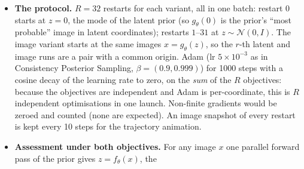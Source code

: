 \documentclass[11pt]{article}
\begin{document}
\begin{itemize}
        (the posterior of $z$ given $y$ has density $\propto \mathcal{N}(z)\,
        p(y|g_\theta(z))$, the Jacobian cancelling exactly because
        $p_\theta(g_\theta(z))\,|\det \partial g_\theta/\partial z| =
        \mathcal{N}(z)$); $J_x$ is the negative log posterior density in
        pixel coordinates. Since $\log p_\theta(x) = \log\mathcal{N}(f_\theta(x)) +
        \log|\det \partial f_\theta/\partial x|$,
        \[
          J_x(g_\theta(z)) = J_z(z) - \log\left|\det \frac{\partial f_\theta}{\partial x}\right|_{g_\theta(z)},
        \]
        so the two minimisers coincide only where the flow's log-Jacobian
        is flat. A MAP estimate is not invariant under reparametrisation; a
        density is. Both constants ($\tfrac{n}{2}\log 2\pi$ and
        $\tfrac{n_{\rm obs}}{2}\log 2\pi\sigma^2$) are kept, so $J_z$ and
        $J_x$ are on the same nats scale and every image can be scored under
        both. The latent MAP is what a one-step generator without a density
        (a GAN, a consistency model) allows; the image MAP needs
        $\log p_\theta$ and exists here because the prior is a flow. Their
        costs are opposite: one step of $J_z$ is the differentiable
        sequential inverse of step 10 ($8 \times 63$ cached token steps,
        forward and backward), one step of $J_x$ is one parallel forward
        pass through the prior with per-block activation checkpointing.
  \item \textbf{The protocol.} $R = 32$ restarts for each variant, all in
        one batch: restart 0 starts at $z = 0$, the mode of the latent prior
        (so $g_\theta(0)$ is the prior's ``most probable'' image in latent
        coordinates); restarts $1$--$31$ at $z \sim \mathcal{N}(0, I)$. The
        image variant starts at the same images $x = g_\theta(z)$, so the
        $r$-th latent and image runs are a pair with a common origin. Adam
        (lr $5 \times 10^{-3}$ as in Consistency Posterior Sampling,
        $\beta = (0.9, 0.999)$) for 1000 steps with a cosine decay of the
        learning rate to zero, on the \emph{sum} of the $R$ objectives:
        because the objectives are independent and Adam is per-coordinate,
        this is $R$ independent optimisations in one launch. Non-finite
        gradients would be zeroed and counted (none are expected). An
        image snapshot of every restart is kept every 10 steps for the
        trajectory animation.
  \item \textbf{Assessment under both objectives.} For any image $x$ one
        parallel forward pass of the prior gives $z = f_\theta(x)$, the

\end{itemize}
\end{document}
